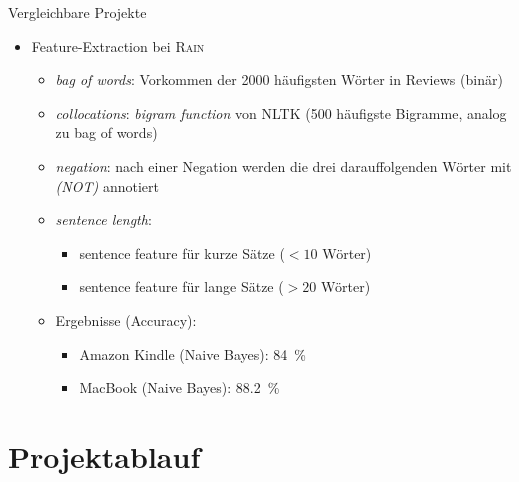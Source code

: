 \documentclass[note=hide]{beamer} %
\newcommand{\feature}[1]{\textcolor{dunkelrot}{\emph{#1}}}
\begin{document}
\begin{frame}{Vergleichbare Projekte}
	\begin{itemize}
		\item Feature-Extraction bei \textsc{Rain}
		\begin{itemize}
			\item \feature{bag of words}: Vorkommen der 2000 häufigsten Wörter in Reviews (binär)
			\item \feature{collocations}: \emph{bigram function} von NLTK (500 häufigste Bigramme, analog zu bag of words)
			\item \feature{negation}: nach einer Negation werden die drei darauffolgenden Wörter mit \emph{(NOT)} annotiert
			\item \feature{sentence length}: 
			\begin{itemize}
				\item sentence feature für kurze Sätze ($<10$ Wörter)
				\item sentence feature für lange Sätze ($>20$ Wörter)
			\end{itemize}
		\item Ergebnisse (Accuracy):
			\begin{itemize}
				\item Amazon Kindle (Naive Bayes): \SI{84}{\%}
				\item MacBook (Naive Bayes): \SI{88.2}{\%}
			\end{itemize}
		\end{itemize}
	\end{itemize}
\end{frame}

\section{Projektablauf}
\end{document}
